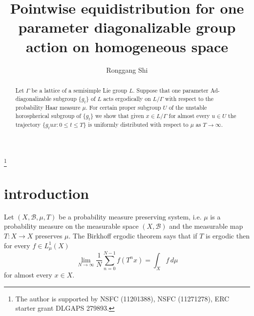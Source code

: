 \documentclass[12pt]{amsart}
\theoremstyle{definition}
\theoremstyle{remark}
\numberwithin{equation}{section}
\begin{document}
\title{Pointwise equidistribution  for    one parameter diagonalizable group action on homogeneous space}

\author{Ronggang Shi}
\address{School of Mathematical Sciences, Tel Aviv University, Tel Aviv 69978, Israel, and
School of Mathematical Sciences, Xiamen University, Xiamen 361005, PR China}
 
\thanks{The author is supported by NSFC (11201388), NSFC (11271278),
 ERC starter grant DLGAPS 279893.}


\date{}


\begin{abstract}
\noindent
Let $\Gamma$ be a lattice of a semisimple Lie group $L$. 
 Suppose that one parameter  Ad-diagonalizable subgroup  
$\{g_t\}$ of  $L$ acts ergodically on $L/\Gamma$ 
with respect to the probability Haar measure $\mu$.
For certain proper subgroup $U$ of 
the unstable horospherical subgroup  of $\{g_t\}$ we show that given $x\in L/\Gamma$
for almost every  $u\in U$   the trajectory
$\{g_tux: 0\le t\le T\}$ is uniformly distributed   with respect to $\mu$ as $T\to \infty$.
\end{abstract}

\maketitle

\markright{}

\section{introduction}\label{sec;intro}

Let $(X, \mathcal B,\mu, T)$ be a probability measure preserving system, i.e. 
$\mu$ is a probability measure on the measurable space $(X, \mathcal B)$ and
the measurable map
$T:X\to X$ preserves $\mu$. 
The Birkhoff  ergodic theorem 
says that 
if $T$ is ergodic then  for every $f\in L^1_\mu(X)$ 
\begin{equation}\label{eq;birkhoff}
\lim_{N\to \infty}\frac{1}{N} \sum_{n=0}^{N-1}f(T^nx)=\int_Xf\, d\mu
\end{equation}
for  almost every $x\in X$. 
\end{document}
